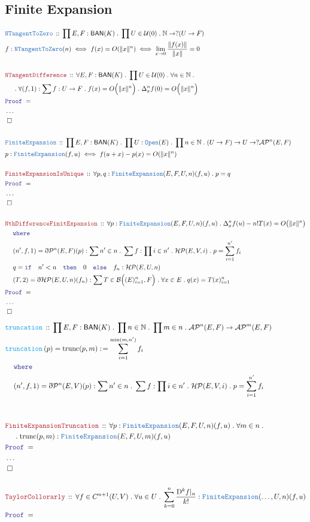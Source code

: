 \documentclass[12pt]{scrartcl}
\newcommand{\TYPE}[1]{\textcolor{NavyBlue}{\mathtt{#1}}}
\newcommand{\FUNC}[1]{\textcolor{Cerulean}{\mathtt{#1}}}
\newcommand{\LOGIC}[1]{\textcolor{Blue}{\mathtt{#1}}}
\newcommand{\THM}[1]{\textcolor{Maroon}{\mathtt{#1}}}
\renewcommand{\.}{\; . \;}
\newcommand{\de}{: \kern 0.1pc =}
\newcommand{\Act}[1]{\left( #1 \right)}
\newcommand{\Theorem}[2]{& \THM{#1} \, :: \, #2 \\ & \Proof = \\ }
\newcommand{\DeclareType}[2]{& \TYPE{#1} \, :: \, #2 \\}
\newcommand{\DeclareFunc}[2]{& \FUNC{#1} \, :: \, #2 \\}
\newcommand{\DefineNamedFunc}[4]{&  \FUNC{#1}\Act{#2} = #3 \de #4 \\}
\newcommand{\NewLine}{\\ & \kern 1pc}
\newcommand{\Page}[1]{\begin{align*} #1 \end{align*}   }
\newcommand{ \bd }{ \ByDef }
\newcommand{\NoProof}{ & \ldots \\ \EndProof}
\newcommand{\Nat}{\mathbb{N} }
\newcommand{\QED}{\; \square}
\newcommand{\EndProof}{& \QED \\}
\newcommand{\ByDef}{\eth}
\newcommand{\Proof}{\LOGIC{Proof} \; }
\newcommand{\HP}{\mathcal{HP}} %
\renewcommand{\P}{\mathcal{P}} %
\newcommand{\AP}{\mathcal{AP}} %
\newcommand{\BAN}{\mathsf{BAN}} %
\newcommand{\D}{\mathrm{D}}
\newcommand{\B}{\mathcal{B}}
\begin{document}
\subsection{Finite Expansion}
\Page{ 
	\DeclareType{NTangentToZero }{ \prod E,F : \BAN(K) \. \prod U \in \mathcal{U}(0) \. \Nat \to ?(U \to F)   }
	& f : \TYPE{NTangentToZero}(n) \iff f(x) = O(\|x\|^n) \iff \lim_{x \to 0} \frac{\| f(x) \|}{\|x\|} = 0 \\
	\\
	\Theorem{NTangentDifference}{
		\forall E,F : \BAN(K) \. \prod U \in \mathcal{U}(0) \. \forall n \in \Nat \. 
		\NewLine \.
		\forall (f,1) : \sum f : U \to F \. f(x) = O\Big(\| x \|^n\Big)\.
		\Delta^n_x f(0) = O\Big(\|x\|^n\Big)
	}
	\NoProof
	\\
	\DeclareType{FiniteExpansion}{ \prod E,F : \BAN(K) \. \prod U : \TYPE{Open}(E) \. \prod n \in \Nat \. (U \to F) \to U \to ?\AP^n(E,F)  }
	& p : \TYPE{FiniteExpansion}(f,u) \iff f(u + x) - p(x) = O(\|x\|^n) \\
	\\
	\Theorem{FiniteExpansionIsUnique}{ \forall p,q : \TYPE{FiniteExpansion}(E,F,U,n)(f,u) \. p = q }
	\NoProof
	\\
	\Theorem{NthDifferenceFinitExpansion}{ 
		\forall p : \TYPE{FiniteExpansion}(E,F,U,n)(f,u) \. \Delta^n_x f(u) - n!T(x) = O\big(\| x  \|^n \big)
		\NewLine
		\LOGIC{where}
		\NewLine
 		(n',f,1) = \bd \P^n(E,F)(p) : \sum n' \in n \. \sum f : \prod i \in n' \. \HP(E,V,i) \. p = \sum^{n'}_{i = 1} f_i \NewLine
		q = \LOGIC{if} \quad n' < n \quad \LOGIC{then} \quad 0 \quad \LOGIC{else} \quad f_n : \HP(E,U,n) \NewLine 
		(T,2) = \bd \HP(E,U,n)(f_n) : \sum T \in \B\Big( (E)^n_{i = 1}, F \Big) \. \forall x \in E \. q(x) = T(x)^n_{i=1}
	}
	\NoProof
} \Page{
	\DeclareFunc{truncation}{ \prod E,F : \BAN(K) \. \prod n \in \Nat \. \prod m \in n \. \AP^n(E,F) \to \AP^{m}(E,F) }
	\DefineNamedFunc{truncation}{ p  }{  \mathrm{trunc}(p,m) }{  
		\sum^{\min(m,n')}_{i = 1} f_i 
		\NewLine \LOGIC{where} \NewLine
 		(n',f,1) = \bd \P^n(E,V)(p) : \sum n' \in n \. \sum f : \prod i \in n' \. \HP(E,V,i) \. p = \sum^{n'}_{i = 1} f_i \NewLine
	}
	\\
	\Theorem{FiniteExpansionTruncation}{\forall p : \TYPE{FiniteExpansion}(E,F,U,n)(f,u) \. \forall m \in n \. 
	\NewLine \.
	\mathrm{trunc}(p,m) : \TYPE{FiniteExpansion}(E,F,U,m)(f,u)}
	\NoProof
	\\
	\Theorem{TaylorCollorarly}{ \forall f \in C^{n + 1}(U,V) \. \forall u \in U \. \sum^n_{k = 0} \frac{\D^k f |_u}{k!} : \TYPE{FiniteExpansion}(\ldots,U,n)(f,u)  }
}
\end{document}
